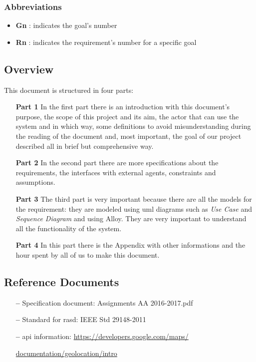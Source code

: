 \subsubsection{Abbreviations} \label{abbre}
\begin{itemize}
\item \textbf{Gn} : indicates the goal's number
\item \textbf{Rn} : indicates the requirement's number for a specific goal
\end{itemize}


\subsection{Overview} \label{subsec:overview}
This document is structured in four parts:
\begin{itemize}
\item[\textbf{Part 1}]In the first part there is an introduction with this document's purpose, the scope of this project and its aim, the actor that can use  the system and in which way, some definitions to avoid misunderstanding during the reading of the document and, most important, the goal of our project described all in brief but comprehensive way.  
\item[\textbf{Part 2}]In the second part there are more specifications about the requirements, the interfaces with external agents, constraints and assumptions.
\item[\textbf{Part 3}]The third part is very important because there are all the models for the requirement: they are modeled using \acs{uml} diagrams such as \emph{Use Case} and \emph{Sequence Diagram} and using Alloy. They are very important to understand all the functionality of the system.  
\item[\textbf{Part 4}]In this part there is the Appendix with other informations and the hour spent by all of us to make this document.
\end{itemize}

\subsection{Reference Documents} \label{ref-doc}

\begin{itemize}
\item[\textbf{--}] Specification document: Assignments AA 2016-2017.pdf
\item[\textbf{--}] Standard for \acs{rasd}: IEEE Std 29148-2011
\item[\textbf{--}] \acs{api} information: 
\url{https://developers.google.com/maps/}

\url{documentation/geolocation/intro}

\end{itemize}



